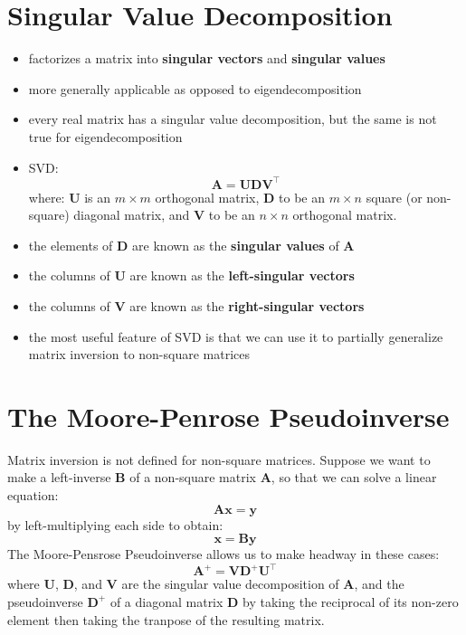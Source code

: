 \documentclass[11pt,twocolumn]{report}
\begin{document}
\section{Singular Value Decomposition}
\begin{itemize}
  \item factorizes a matrix into \textbf{singular vectors} and \textbf{singular
      values}
  \item more generally applicable as opposed to eigendecomposition
  \item every real matrix has a singular value decomposition, but the same is
    not true for eigendecomposition
  \item SVD:
    \begin{equation}
      \bm{A} = \bm{UDV}^\intercal
    \end{equation}
    where: $\bm{U}$ is an $m \times m$ orthogonal matrix, $\bm{D}$ to be an $m
    \times n$ square (or non-square) diagonal matrix, and $\bm{V}$ to be an $n
    \times n$ orthogonal matrix.
  \item the elements of $\bm{D}$ are known as the \textbf{singular values} of
    $\bm{A}$
  \item the columns of $\bm{U}$ are known as the \textbf{left-singular vectors}
  \item the columns of $\bm{V}$ are known as the \textbf{right-singular vectors}
  \item the most useful feature of SVD is that we can use it to partially
    generalize matrix inversion to non-square matrices
\end{itemize}

\section{The Moore-Penrose Pseudoinverse}
Matrix inversion is not defined for non-square matrices. Suppose we want to
make a left-inverse $\bm{B}$ of a non-square matrix $\bm{A}$, so that we can
solve a linear equation:
\begin{equation}
  \bm{Ax} = \bm{y}
\end{equation}
by left-multiplying each side to obtain:
\begin{equation}
  \bm{x} = \bm{By}
\end{equation}
The Moore-Pensrose Pseudoinverse allows us to make headway in these cases:
\begin{equation}
  \bm{A}^+ = \bm{VD}^+\bm{U}^\intercal
\end{equation}
where $\bm{U}$, $\bm{D}$, and $\bm{V}$ are the singular value decomposition of
$\bm{A}$, and the pseudoinverse $\bm{D}^+$ of a diagonal matrix $\bm{D}$ by
taking the reciprocal of its non-zero element then taking the tranpose of the
resulting matrix.
\end{document}
